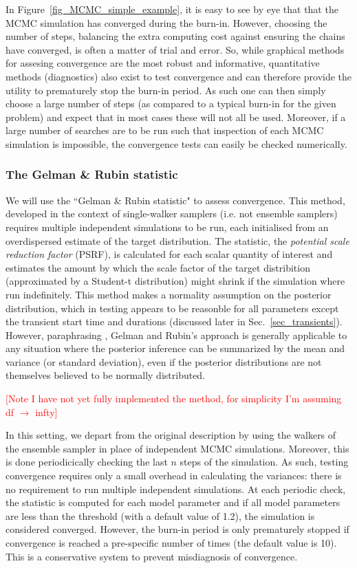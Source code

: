 \documentclass[aps, prd, twocolumn, superscriptaddress, floatfix, showpacs, nofootinbib, longbibliography]{revtex4-1}
\newcommand{\comment}[1]{\textcolor{red}{[#1]}}
\begin{document}
In Figure~\ref{fig_MCMC_simple_example}, it is easy to see by eye that that the
MCMC simulation has converged during the burn-in. However, choosing the number
of steps, balancing the extra computing cost against ensuring the chains have
converged, is often a matter of trial and error. So, while graphical methods
for assesing convergence are the most robust and informative, quantitative
methods (diagnostics) also exist to test convergence and can therefore provide
the utility to prematurely stop the burn-in period. As such one can then simply
choose a large number of steps (as compared to a typical burn-in for the given
problem) and expect that in most cases these will not all be used. Moreover, if
a large number of searches are to be run such that inspection of each MCMC
simulation is impossible, the convergence tests can easily be checked
numerically.

\subsubsection{The Gelman \& Rubin statistic}
We will use the ``Gelman \& Rubin statistic" \citep{gelman1992} to assess
convergence. This method, developed in the context of single-walker samplers
(i.e. not ensemble samplers) requires multiple independent simulations to be
run, each initialised from an overdispersed estimate of the target
distribution. The statistic, the \emph{potential scale reduction factor}
(PSRF), is calculated for each scalar quantity of interest and estimates the
amount by which the scale factor of the target distribition (approximated by a
Student-t distribution) might shrink if the simulation where run indefinitely.
This method makes a normality assumption on the posterior distribution, which
in testing appears to be reasonble for all parameters except the transient
start time and durations (discussed later in Sec.~\ref{sec_transients}).
However, paraphrasing \citet{brooks1998}, Gelman and Rubin's approach is
generally applicable to any situation where the posterior inference can be
summarized by the mean and variance (or standard deviation), even if the
posterior distributions are not themselves believed to be normally distributed.

\comment{Note I have not yet fully implemented the method, for simplicity I'm
         assuming df $\rightarrow$ infty}

In this setting, we depart from the original description by using the walkers
of the ensemble sampler in place of independent MCMC simulations. Moreover,
this is done periodicically checking the last $n$ steps of the simulation. As
such, testing convergence requires only a small overhead in calculating the
variances: there is no requirement to run multiple independent simulations.
At each periodic check, the statistic is computed for each model parameter
and if all model parameters are less than the threshold (with a default value
of 1.2), the simulation is considered converged. However, the burn-in period is
only prematurely stopped if convergence is reached a pre-specific number of
times (the default value is 10). This is a conservative system to prevent
misdiagnosis of convergence.
\end{document}
